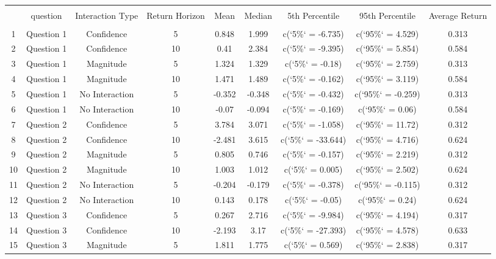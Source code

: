 
\begin{table}[!htbp] \centering 
  \caption{} 
  \label{} 
\begin{tabular}{@{\extracolsep{5pt}} ccccccccc} 
\\[-1.8ex]\hline 
\hline \\[-1.8ex] 
 & question & Interaction Type & Return Horizon & Mean & Median & 5th Percentile & 95th Percentile & Average Return \\ 
\hline \\[-1.8ex] 
1 & Question 1 & Confidence & 5 & 0.848 & 1.999 & c(`5\%` = -6.735) & c(`95\%` = 4.529) & 0.313 \\ 
2 & Question 1 & Confidence & 10 & 0.41 & 2.384 & c(`5\%` = -9.395) & c(`95\%` = 5.854) & 0.584 \\ 
3 & Question 1 & Magnitude & 5 & 1.324 & 1.329 & c(`5\%` = -0.18) & c(`95\%` = 2.759) & 0.313 \\ 
4 & Question 1 & Magnitude & 10 & 1.471 & 1.489 & c(`5\%` = -0.162) & c(`95\%` = 3.119) & 0.584 \\ 
5 & Question 1 & No Interaction & 5 & -0.352 & -0.348 & c(`5\%` = -0.432) & c(`95\%` = -0.259) & 0.313 \\ 
6 & Question 1 & No Interaction & 10 & -0.07 & -0.094 & c(`5\%` = -0.169) & c(`95\%` = 0.06) & 0.584 \\ 
7 & Question 2 & Confidence & 5 & 3.784 & 3.071 & c(`5\%` = -1.058) & c(`95\%` = 11.72) & 0.312 \\ 
8 & Question 2 & Confidence & 10 & -2.481 & 3.615 & c(`5\%` = -33.644) & c(`95\%` = 4.716) & 0.624 \\ 
9 & Question 2 & Magnitude & 5 & 0.805 & 0.746 & c(`5\%` = -0.157) & c(`95\%` = 2.219) & 0.312 \\ 
10 & Question 2 & Magnitude & 10 & 1.003 & 1.012 & c(`5\%` = 0.005) & c(`95\%` = 2.502) & 0.624 \\ 
11 & Question 2 & No Interaction & 5 & -0.204 & -0.179 & c(`5\%` = -0.378) & c(`95\%` = -0.115) & 0.312 \\ 
12 & Question 2 & No Interaction & 10 & 0.143 & 0.178 & c(`5\%` = -0.05) & c(`95\%` = 0.24) & 0.624 \\ 
13 & Question 3 & Confidence & 5 & 0.267 & 2.716 & c(`5\%` = -9.984) & c(`95\%` = 4.194) & 0.317 \\ 
14 & Question 3 & Confidence & 10 & -2.193 & 3.17 & c(`5\%` = -27.393) & c(`95\%` = 4.578) & 0.633 \\ 
15 & Question 3 & Magnitude & 5 & 1.811 & 1.775 & c(`5\%` = 0.569) & c(`95\%` = 2.838) & 0.317 \\ 

\end{tabular}
\end{table}
